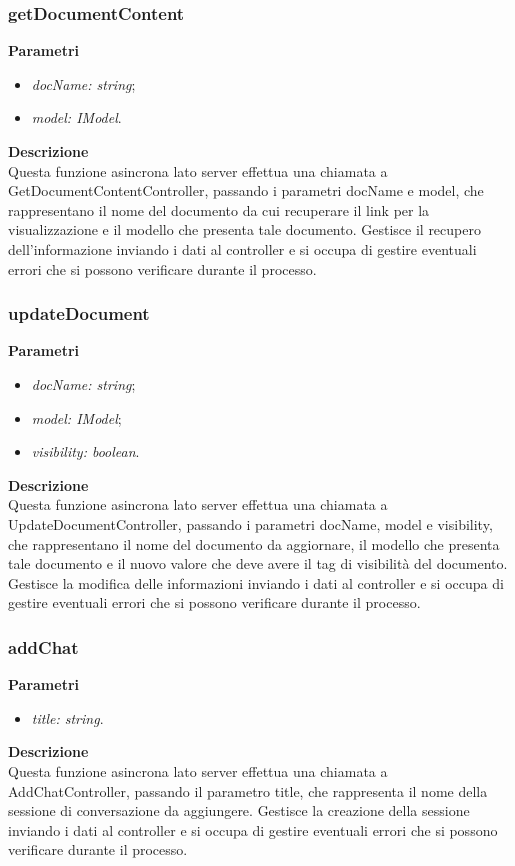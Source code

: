 \subsubsection{getDocumentContent}
\textbf{Parametri}
\begin{itemize}[itemsep=-4pt]
    \item \textit{docName: string};
    \item \textit{model: IModel}.
\end{itemize}
\textbf{Descrizione}\\
Questa funzione asincrona lato server effettua una chiamata a GetDocumentContentController, passando i parametri docName e model, che rappresentano il nome del documento da cui recuperare il link per la visualizzazione e il modello che presenta tale documento. Gestisce il recupero dell'informazione inviando i dati al controller e si occupa di gestire eventuali errori che si possono verificare durante il processo.

\subsubsection{updateDocument}
\textbf{Parametri}
\begin{itemize}[itemsep=-4pt]
    \item \textit{docName: string};
    \item \textit{model: IModel};
    \item \textit{visibility: boolean}.
\end{itemize}
\textbf{Descrizione}\\
Questa funzione asincrona lato server effettua una chiamata a UpdateDocumentController, passando i parametri docName, model e visibility, che rappresentano il nome del documento da aggiornare, il modello che presenta tale documento e il nuovo valore che deve avere il tag di visibilità del documento. Gestisce la modifica delle informazioni inviando i dati al controller e si occupa di gestire eventuali errori che si possono verificare durante il processo.

\subsubsection{addChat}
\textbf{Parametri}
\begin{itemize}
    \item \textit{title: string}.
\end{itemize}
\textbf{Descrizione}\\
Questa funzione asincrona lato server effettua una chiamata a AddChatController, passando il parametro title, che rappresenta il nome della sessione di conversazione da aggiungere. Gestisce la creazione della sessione inviando i dati al controller e si occupa di gestire eventuali errori che si possono verificare durante il processo.

